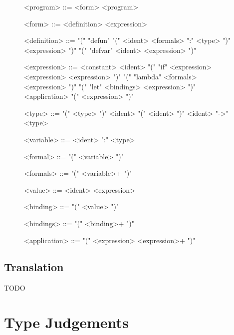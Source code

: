 \documentclass[11pt,a4paper]{article}
\begin{document}
\begin{figure}[H]
\small
\setlength{\grammarindent}{8em}
\renewcommand{\grammarlabel}[2]{\synt{#1}\hfill#2}
\begin{grammar}
<program> ::= <form> <program>

<form> ::= <definition>
    \alt <expression>

<definition> ::= "(" "defun" "(" <ident> <formals> ":" <type> ")" <expression> ")"
    \alt "(" "defvar" <ident> <expression> ")"



<expression> ::= <constant>
    \alt <ident>
    \alt "(" "if" <expression> <expression> <expression> ")"
    \alt "(" "lambda" <formals> <expression> ")"
    \alt "(" "let" <bindings> <expression> ")"
    \alt <application>
    \alt "(" <expression> ")"

<type> ::= "(" <type> ")"
    \alt <ident>
    \alt "(" <ident> ")"
    \alt <ident> "->" <type>

<variable> ::= <ident> ":" <type>

<formal> ::= "(" <variable> ")"

<formals> ::= "(" <variable>+ ")"

<value> ::= <ident> <expression>

<binding> ::= "(" <value> ")"

<bindings> ::= "(" <binding>+ ")"

<application> ::= "(" <expression> <expression>+ ")"
\end{grammar}
\end{figure}



\subsection{Translation}

TODO



\section{Type Judgements}
\end{document}
